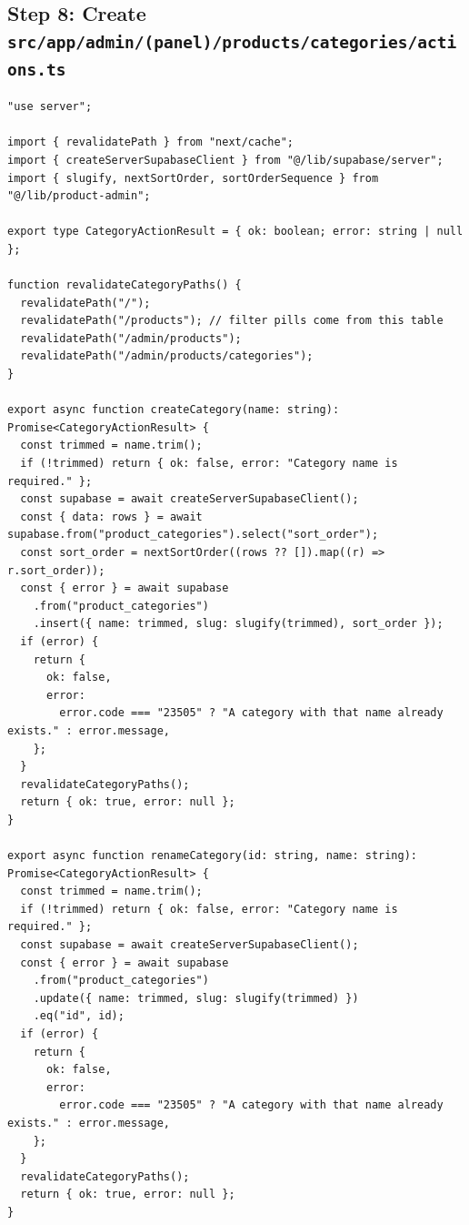 \documentclass[11pt,a4paper]{article}
\begin{document}
\subsection*{Step 8: Create \texttt{src/app/admin/(panel)/products/categories/actions.ts}}

\begin{lstlisting}
"use server";

import { revalidatePath } from "next/cache";
import { createServerSupabaseClient } from "@/lib/supabase/server";
import { slugify, nextSortOrder, sortOrderSequence } from "@/lib/product-admin";

export type CategoryActionResult = { ok: boolean; error: string | null };

function revalidateCategoryPaths() {
  revalidatePath("/");
  revalidatePath("/products"); // filter pills come from this table
  revalidatePath("/admin/products");
  revalidatePath("/admin/products/categories");
}

export async function createCategory(name: string): Promise<CategoryActionResult> {
  const trimmed = name.trim();
  if (!trimmed) return { ok: false, error: "Category name is required." };
  const supabase = await createServerSupabaseClient();
  const { data: rows } = await supabase.from("product_categories").select("sort_order");
  const sort_order = nextSortOrder((rows ?? []).map((r) => r.sort_order));
  const { error } = await supabase
    .from("product_categories")
    .insert({ name: trimmed, slug: slugify(trimmed), sort_order });
  if (error) {
    return {
      ok: false,
      error:
        error.code === "23505" ? "A category with that name already exists." : error.message,
    };
  }
  revalidateCategoryPaths();
  return { ok: true, error: null };
}

export async function renameCategory(id: string, name: string): Promise<CategoryActionResult> {
  const trimmed = name.trim();
  if (!trimmed) return { ok: false, error: "Category name is required." };
  const supabase = await createServerSupabaseClient();
  const { error } = await supabase
    .from("product_categories")
    .update({ name: trimmed, slug: slugify(trimmed) })
    .eq("id", id);
  if (error) {
    return {
      ok: false,
      error:
        error.code === "23505" ? "A category with that name already exists." : error.message,
    };
  }
  revalidateCategoryPaths();
  return { ok: true, error: null };
}


\end{lstlisting}
\end{document}

